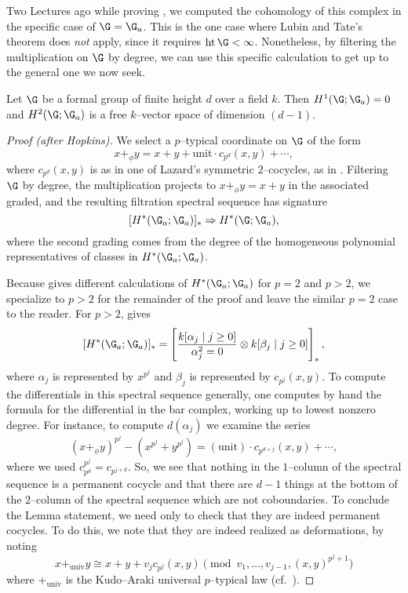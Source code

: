 Two Lectures ago while proving , we computed the cohomology of this complex in the specific case of $\G = \G_a$.  This is the one case where Lubin and Tate's theorem does \emph{not} apply, since it requires $\height \G < \infty$.  Nonetheless, by filtering the multiplication on $\G$ by degree, we can use this specific calculation to get up to the general one we now seek.

\begin{lemma}\label{CalculationOfLTTangentSpace}
Let $\G$ be a formal group of finite height $d$ over a field $k$.  Then $H^1(\G; \G_a) = 0$ and $H^2(\G; \G_a)$ is a free $k$--vector space of dimension $(d - 1)$.
\end{lemma}
\begin{proof}[Proof (after Hopkins)]
We select a $p$--typical coordinate on $\G$ of the form \[x +_\phi y = x + y + \mathrm{unit} \cdot c_{p^d}(x, y) + \cdots,\] where $c_{p^d}(x, y)$ is as in one of Lazard's symmetric $2$--cocycles, as in .  Filtering $\G$ by degree, the multiplication projects to $x +_\phi y = x + y$ in the associated graded, and the resulting filtration spectral sequence has signature \[[H^*(\G_a; \G_a)]_* \Rightarrow H^*(\G; \G_a),\] where the second grading comes from the degree of the homogeneous polynomial representatives of classes in $H^*(\G_a; \G_a)$.

Because  gives different calculations of $H^*(\G_a; \G_a)$ for $p = 2$ and $p > 2$, we specialize to $p > 2$ for the remainder of the proof and leave the similar $p = 2$ case to the reader.  For $p > 2$,  gives \[[H^*(\G_a; \G_a)]_* = \left[\frac{k[\alpha_j \mid j \ge 0]}{\alpha_j^2 = 0} \otimes k[\beta_j \mid j \ge 0]\right]_*,\] where $\alpha_j$ is represented by $x^{p^j}$ and $\beta_j$ is represented by $c_{p^j}(x, y)$.  To compute the differentials in this spectral sequence generally, one computes by hand the formula for the differential in the bar complex, working up to lowest nonzero degree.  For instance, to compute $d(\alpha_j)$ we examine the series \[(x +_\phi y)^{p^j} - (x^{p^j} + y^{p^j}) = (\text{unit}) \cdot c_{p^{d + j}}(x, y) + \cdots,\] where we used $c_{p^d}^{p^j} = c_{p^{j+d}}$.  So, we see that nothing in the $1$--column of the spectral sequence is a permanent cocycle and that there are $d - 1$ things at the bottom of the $2$--column of the spectral sequence which are not coboundaries.  To conclude the Lemma statement, we need only to check that they are indeed permanent cocycles.  To do this, we note that they are indeed realized as deformations, by noting \[x +_{\mathrm{univ}} y \cong x + y + v_j c_{p^j}(x, y) \pmod{v_1, \ldots, v_{j-1}, (x, y)^{p^j+1}}\] where $+_{\mathrm{univ}}$ is the Kudo--Araki universal $p$--typical law (cf.\ \cite[Proposition 1.1]{LubinTate}).
\end{proof}

